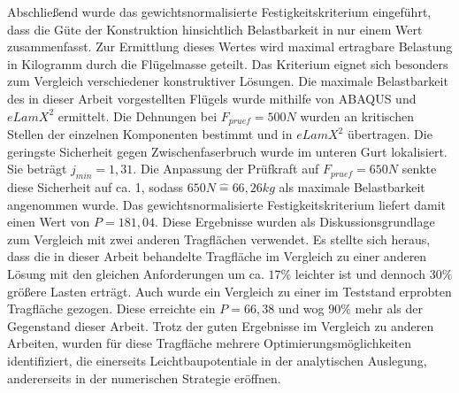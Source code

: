 \noindent Abschließend wurde das gewichtsnormalisierte Festigkeitskriterium eingeführt, dass die Güte der Konstruktion hinsichtlich Belastbarkeit in nur einem Wert zusammenfasst. Zur Ermittlung dieses Wertes wird maximal ertragbare Belastung in Kilogramm durch die Flügelmasse geteilt. Das Kriterium eignet sich besonders zum Vergleich verschiedener konstruktiver Lösungen. Die maximale Belastbarkeit des in dieser Arbeit vorgestellten Flügels wurde mithilfe von ABAQUS und $ eLamX^{2} $ ermittelt. Die Dehnungen bei $ F_{pruef}=500N $ wurden an kritischen Stellen der einzelnen Komponenten bestimmt und in $ eLamX^{2} $ übertragen. Die geringste Sicherheit gegen Zwischenfaserbruch wurde im unteren Gurt lokalisiert. Sie beträgt $ j_{min}=1,31 $. Die Anpassung der Prüfkraft auf $ F_{pruef}=650N $ senkte diese Sicherheit auf ca. 1, sodass $ 650N\hat{=}66,26kg $ als maximale Belastbarkeit angenommen wurde. Das gewichtsnormalisierte Festigkeitskriterium liefert damit einen Wert von $ P=181,04 $. Diese Ergebnisse wurden als Diskussionsgrundlage zum Vergleich mit zwei anderen Tragflächen verwendet. Es stellte sich heraus, dass die in dieser Arbeit behandelte Tragfläche im Vergleich zu einer anderen Lösung mit den gleichen Anforderungen um ca. $ 17\% $ leichter ist und dennoch $ 30\%$ größere Lasten erträgt. Auch wurde ein Vergleich zu einer im Teststand erprobten Tragfläche gezogen. Diese erreichte ein $ P=66,38 $ und wog $ 90\% $ mehr als der Gegenstand dieser Arbeit. Trotz der guten Ergebnisse im Vergleich zu anderen Arbeiten, wurden für diese Tragfläche mehrere Optimierungsmöglichkeiten identifiziert, die einerseits Leichtbaupotentiale in der analytischen Auslegung, andererseits in der numerischen Strategie eröffnen.   
